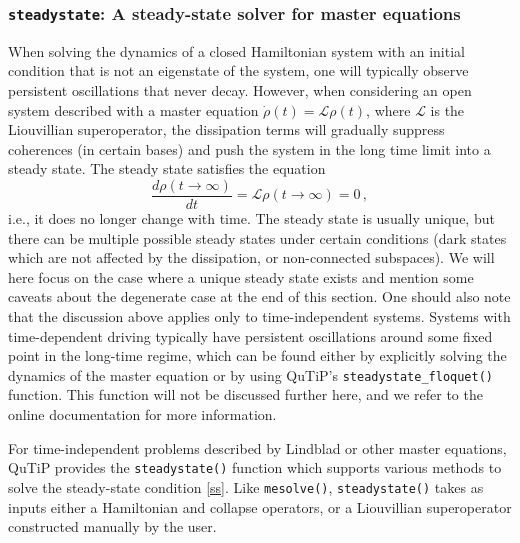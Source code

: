 \documentclass[preprint,3p,sort&compress]{elsarticle}
\def\code#1{\texttt{#1}}
\begin{document}
\subsubsection{\textup{\code{steadystate}}: A steady-state solver for master equations}

When solving the dynamics of a closed Hamiltonian system with an initial condition that is not an eigenstate of the system, one will typically observe persistent oscillations that never decay.  However, when considering an open system described with a master equation $\dot \rho(t) = \mathcal L \rho(t)$, where $\mathcal L$ is the Liouvillian superoperator, the dissipation terms will gradually suppress coherences (in certain bases) and push the system in the long time limit into a steady state. The steady state satisfies the equation
\begin{equation}
\frac{d \rho(t\rightarrow \infty)}
{dt} = \mathcal{L}\rho(t\rightarrow \infty) = 0 \, , \label{ss}
\end{equation}
i.e., it does no longer change with time. The steady state is usually unique, but there can be multiple possible steady states under certain conditions (dark states which are not affected by the dissipation, or non-connected subspaces). We will here focus on the case where a unique steady state exists and mention some caveats about the degenerate case at the end of this section. One should also note that the discussion above applies only to time-independent systems. Systems with time-dependent driving typically have persistent oscillations around some fixed point in the long-time regime, which can be found either by explicitly solving the dynamics of the master equation or by using QuTiP's \code{steadystate\_floquet()} function. This function will not be discussed further here, and we refer to the online documentation for more information.

For time-independent problems described by Lindblad or other master equations, QuTiP provides the \code{steadystate()} function which supports various methods to solve the steady-state condition \eqref{ss}.  Like \code{mesolve()}, \code{steadystate()} takes as inputs either a Hamiltonian and collapse operators, or a Liouvillian superoperator constructed manually by the user.
\end{document}
